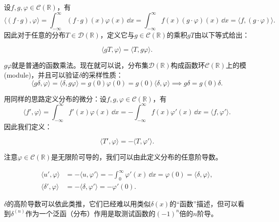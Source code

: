 设$f,g,\varphi\in\mathcal{C}(\mathbb{R})$，有
\begin{equation}
    \langle (f\cdot g),\varphi\rangle=\int_{-\infty}^{\infty}(f\cdot g)(x)\varphi(x)\,\dd x=\int_{-\infty}^{\infty}f(x)(g\cdot\varphi)(x)\,\dd x=\langle f,(g\cdot\varphi)\rangle.
\end{equation}
因此对于任意的分布$T\in\mathcal{D}(\mathbb{R})$，定义它与$g\in\mathcal{C}(\mathbb{R})$的乘积$gT$由以下等式给出：
\begin{definition}[分布与函数的乘法]
    \begin{equation}
        \langle gT,\varphi\rangle=\langle T,g\varphi\rangle.
    \end{equation}
\end{definition}
$g\varphi$就是普通的函数乘法。现在就可以说，分布集$\mathcal{D}(\mathbb{R})$构成函数环$\mathcal{C}(\mathbb{R})$上的模(module)，并且可以验证$\delta$的采样性质：
\begin{equation}
    \langle g\delta,\varphi\rangle=\langle \delta,g\varphi\rangle=g(0)\varphi(0)=g(0)\langle\delta,\varphi\rangle \implies g\delta=g(0)\delta.
\end{equation}

用同样的思路定义分布的微分：设$f,g,\varphi\in\mathcal{C}(\mathbb{R})$，有
\begin{equation}
    \langle f',\varphi\rangle=\int_{-\infty}^{\infty}f'(x)\varphi(x)\,\dd x=-\int_{-\infty}^{\infty}f(x)\varphi'(x)\,\dd x=\langle f,\varphi'\rangle.
\end{equation}
因此我们定义：
\begin{definition}[分布的微分]
    \begin{equation}
        \langle T',\varphi\rangle=-\langle T,\varphi'\rangle.
    \end{equation}
\end{definition}
注意$\varphi\in\mathcal{C}(\mathbb{R})$是无限阶可导的，我们可以由此定义分布的任意阶导数。
\begin{example}\label{exmp:delta'}
    \begin{align}
        \langle u',\varphi\rangle&=-\langle u,\varphi'\rangle=-\int_{0}^{\infty}\varphi'(x)\,\dd x=\varphi(0)=\langle\delta,\varphi\rangle,\\
        \langle \delta',\varphi\rangle&=-\langle \delta,\varphi'\rangle=-\varphi'(0).
    \end{align}
\end{example}
$\delta$的高阶导数可以依此类推，它们已经难以用类似$\delta(x)$的“函数”描述，但可以看到$\delta^{(n)}$作为一个泛函（分布）作用是取测试函数的$(-1)^n$倍的$n$阶导。

